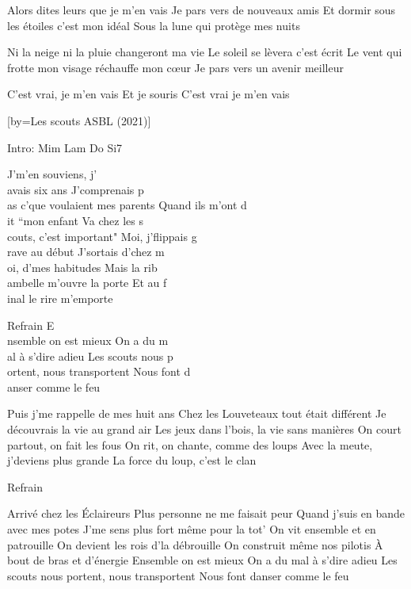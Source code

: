 \beginverse
Alors dites leurs que je m'en vais
Je pars vers de nouveaux amis
Et dormir sous les étoiles c'est mon idéal
Sous la lune qui protège mes nuits
\endverse

\beginverse
Ni la neige ni la pluie changeront ma vie
Le soleil se lèvera c'est écrit
Le vent qui frotte mon visage réchauffe mon cœur
Je pars vers un avenir meilleur
\endverse

\beginverse
C'est vrai, je m'en vais
Et je souris
C'est vrai je m'en vais \\[x3]
\endverse

[by={Les scouts ASBL (2021)}]

\beginverse
Intro: Mim Lam Do Si7
\endverse

\beginverse
J'm'en souviens, j'\\[Mim]avais six ans
J'comprenais p\\[Lam]as c'que voulaient mes parents
Quand ils m'ont d\\[Do]it “mon enfant
Va chez les s\\[Si7]couts, c'est important"
Moi, j'flippais g\\[Mim]rave au début
J'sortais d'chez m\\[Lam]oi, d'mes habitudes
Mais la rib\\[Do]ambelle m'ouvre la porte
Et au f\\[Si7]inal le rire m'emporte
\endverse

\beginverse
Refrain
E\\[Mim]nsemble on est mieux
On a du m\\[Do]al à s'dire adieu
Les scouts nous p\\[Sol]ortent, nous transportent
Nous font d\\[Si7]anser comme le feu
\\[bis]
\endverse

\beginverse
Puis j'me rappelle de mes huit ans
Chez les Louveteaux tout était différent
Je découvrais la vie au grand air
Les jeux dans l'bois, la vie sans manières
On court partout, on fait les fous
On rit, on chante, comme des loups
Avec la meute, j'deviens plus grande
La force du loup, c'est le clan
\endverse

\beginverse
Refrain
\\[bis]
\endverse

\beginverse
Arrivé chez les Éclaireurs
Plus personne ne me faisait peur
Quand j'suis en bande avec mes potes
J'me sens plus fort même pour la tot'
On vit ensemble et en patrouille
On devient les rois d'la débrouille
On construit même nos pilotis
À bout de bras et d'énergie
Ensemble on est mieux
On a du mal à s'dire adieu
Les scouts nous portent, nous transportent
Nous font danser comme le feu
\endverse

